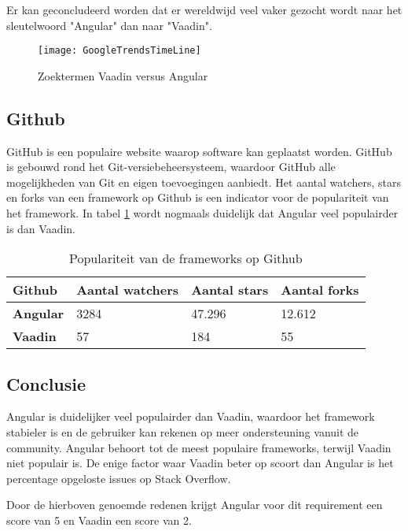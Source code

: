 Er kan geconcludeerd worden dat er wereldwijd veel vaker gezocht wordt naar het sleutelwoord "Angular" dan naar "Vaadin". 

\begin{figure}[H]
	\centering
	\texttt{[image: GoogleTrendsTimeLine]}
	\caption{Zoektermen Vaadin versus Angular \autocite{GoogleTrends2019}}
	\label{fig:Google Trends zoektermen}
\end{figure}

\subsection{Github}
GitHub is een populaire website waarop software kan geplaatst worden. GitHub is gebouwd rond het Git-versiebeheersysteem, waardoor GitHub alle mogelijkheden van Git en eigen toevoegingen aanbiedt. Het aantal watchers, stars en forks van een framework op Github is een indicator voor de populariteit van het framework. In tabel \ref{table:github} wordt nogmaals duidelijk dat Angular veel populairder is dan Vaadin.

\begin{table}[H]
	\begin{tabular}{|l|l|l|l|}
		\hline
		\textbf{Github}  & \textbf{Aantal watchers} & \textbf{Aantal stars} & \textbf{Aantal forks} \\ \hline
		\textbf{Angular} & 3284                     & 47.296                & 12.612                \\ \hline
		\textbf{Vaadin}  & 57                       & 184                   & 55                    \\ \hline
	\end{tabular}
	\caption{Populariteit van de frameworks op Github}
\label{table:github}
\end{table}

\subsection{Conclusie}
Angular is duidelijker veel populairder dan Vaadin, waardoor het framework stabieler is en de gebruiker kan rekenen op meer ondersteuning vanuit de community. Angular behoort tot de meest populaire frameworks, terwijl Vaadin niet populair is. De enige factor waar Vaadin beter op scoort dan Angular is het percentage opgeloste issues op Stack Overflow. 

Door de hierboven genoemde redenen krijgt Angular voor dit requirement een score van 5 en Vaadin een score van 2.



 